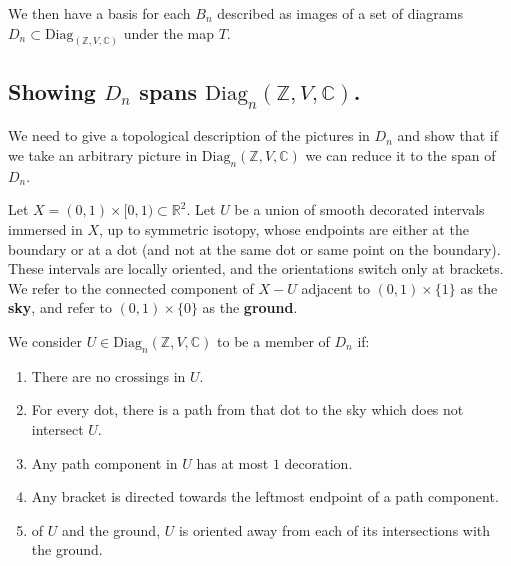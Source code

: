 \documentclass[11pt]{article} %
\begin{document}
 We then have a basis for each $B_n$ described as images of a set of diagrams $D_n \subset \text{Diag}_{(\mathbb{Z},V,\mathbb{C})}$ under the map $T$.

\subsection{Showing $D_n$ spans $\text{Diag}_n(\mathbb{Z},V,\mathbb{C})$.}

We need to give a topological description of the pictures in $D_n$ and show that if we take an arbitrary picture in $\text{Diag}_n(\mathbb{Z},V,\mathbb{C})$ we can reduce it to the span of $D_n$.

\begin{mydef} Let $X=(0,1) \times [0,1) \subset \mathbb{R}^2$. Let $U$ be a union of smooth decorated intervals immersed in $X$, up to symmetric isotopy, whose endpoints are either at the boundary or at a dot (and not at the same dot or same point on the boundary). These intervals are locally oriented, and the orientations switch only at brackets. We refer to the connected component of $X-U$ adjacent to $(0,1) \times \{1\}$ as the \textbf{sky}, and refer to $(0,1) \times \{0\}$ as the \textbf{ground}.
\end{mydef}
\begin{mydef} We consider $U \in \text{Diag}_n(\mathbb{Z},V,\mathbb{C})$ to be a member of $D_n$ if:
\begin{enumerate}
\item There are no crossings in $U$.
\item For every dot, there is a path from that dot to the sky which does not intersect $U$.
\item Any path component in $U$ has at most $1$ decoration.
\item Any bracket is directed towards the leftmost endpoint of a path component.

\item  of $U$ and the ground, $U$ is oriented away from each of its intersections with the ground.
\end{enumerate}
\end{mydef}
\end{document}
